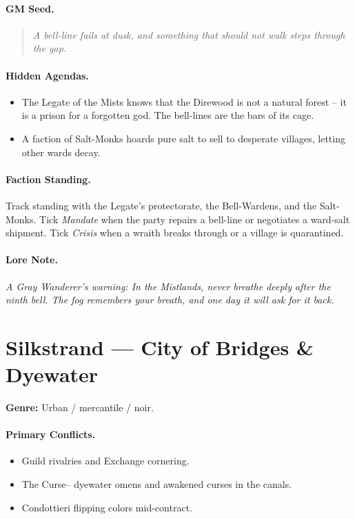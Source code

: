 \paragraph{GM Seed.}
\begin{quote}
\emph{A bell-line fails at dusk, and something that should not walk steps through the gap.}
\end{quote}

\paragraph{Hidden Agendas.}
\begin{itemize}
  \item The Legate of the Mists knows that the Direwood is not a natural forest -- it is a prison for a forgotten god. The bell-lines are the bars of its cage.
  \item A faction of Salt-Monks hoards pure salt to sell to desperate villages, letting other wards decay.
\end{itemize}

\paragraph{Faction Standing.}
Track standing with the Legate's protectorate, the Bell-Wardens, and the Salt-Monks. Tick \textit{Mandate} when the party repairs a bell-line or negotiates a ward-salt shipment. Tick \textit{Crisis} when a wraith breaks through or a village is quarantined.

\paragraph{Lore Note.}
\emph{A Gray Wanderer's warning: \textquotedbl In the Mistlands, never breathe deeply after the ninth bell. The fog remembers your breath, and one day it will ask for it back.\textquotedbl}

\section{Silkstrand --- \textquotedbl City of Bridges \& Dyewater\textquotedbl}
\textbf{Genre:} Urban / mercantile / noir.

\paragraph{Primary Conflicts.}
\begin{itemize}
  \item Guild rivalries and Exchange cornering.
  \item The \textquotedbl Curse\textquotedbl -- dyewater omens and awakened curses in the canals.
  \item Condottieri flipping colors mid-contract.
\end{itemize}

